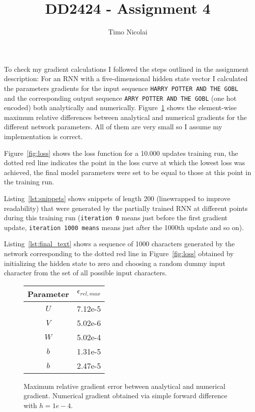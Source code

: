 \documentclass{article}
\begin{document}
\title{DD2424 - Assignment 4}
\author{Timo Nicolai}

\maketitle

\noindent
To check my gradient calculations I followed the steps outlined in the
assignment description: For an RNN with a five-dimensional hidden state vector
I calculated the parameters gradients for the input sequence \texttt{HARRY
POTTER AND THE GOBL} and the corresponding output sequence \texttt{ARRY POTTER
AND THE GOBL} (one hot encoded) both analytically and numerically.
Figure~\ref{fig:gradients} shows the element-wise maximum relative differences
between analytical and numerical gradients for the different network
parameters. All of them are very small so I assume my implementation is
correct.

\bigskip

\noindent
Figure~\ref{fig:loss} shows the loss function for a 10.000 updates training run,
the dotted red line indicates the point in the loss curve at which the lowest
loss was achieved, the final model parameters were set to be equal to those
at this point in the training run.

\bigskip

\noindent
Listing~\ref{lst:snippets} shows snippets of length 200 (linewrapped to improve
readability) that were generated by the partially trained RNN at different
points during this training run (\texttt{iteration 0} means just before the
first gradient update, \texttt{iteration 1000 means} means just after the
1000th update and so on).

\bigskip

\noindent
Listing~\ref{lst:final_text} shows a sequence of 1000 characters generated by
the network corresponding to the dotted red line in Figure~\ref{fig:loss}
obtained by initializing the hidden state to zero and choosing a random dummy
input character from the set of all possible input characters.

\begin{figure}
  \centering
    \begin{tabular}{|c|c|}
    \hline
    Parameter & $\epsilon_{rel,max}$ \\
    \hline
    $U$       & 7.12e-5              \\
    \hline
    $V$       & 5.02e-6              \\
    \hline
    $W$       & 5.02e-4              \\
    \hline
    $b$       & 1.31e-5              \\
    \hline
    $b$       & 2.47e-5              \\
    \hline
    \end{tabular}
  \caption{Maximum relative gradient error between analytical and numerical
           gradient. Numerical gradient obtained via simple forward difference
           with $h = 1e-4$.}
  \label{fig:gradients}
\end{figure}
\end{document}
